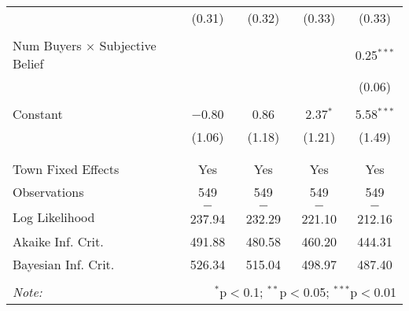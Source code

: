 \begin{table}[!htbp]
\begin{tabular}{@{\extracolsep{5pt}}lcccc}
  & (0.31) & (0.32) & (0.33) & (0.33) \\ 
  & & & & \\ 
 Num Buyers $\times$ Subjective Belief &  &  &  & 0.25$^{***}$ \\ 
  &  &  &  & (0.06) \\ 
  & & & & \\ 
 Constant & $-$0.80 & 0.86 & 2.37$^{*}$ & 5.58$^{***}$ \\ 
  & (1.06) & (1.18) & (1.21) & (1.49) \\ 
  & & & & \\ 
\hline \\[-1.8ex] 
Town Fixed Effects & Yes & Yes & Yes & Yes \\ 
Observations & 549 & 549 & 549 & 549 \\ 
Log Likelihood & $-$237.94 & $-$232.29 & $-$221.10 & $-$212.16 \\ 
Akaike Inf. Crit. & 491.88 & 480.58 & 460.20 & 444.31 \\ 
Bayesian Inf. Crit. & 526.34 & 515.04 & 498.97 & 487.40 \\ 
\hline 
\hline \\[-1.8ex] 
\textit{Note:}  & \multicolumn{4}{r}{$^{*}$p$<$0.1; $^{**}$p$<$0.05; $^{***}$p$<$0.01} \\ 
\end{tabular} 
\end{table} 
